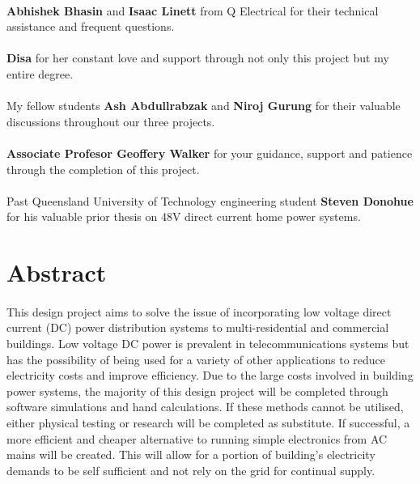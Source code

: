 \paragraph{}
\textbf{Abhishek Bhasin} and \textbf{Isaac Linett} from Q Electrical for their technical assistance and frequent questions.

\paragraph{}
\textbf{Disa} for her constant love and support through not only this project but my entire degree.    

\paragraph{}
My fellow students \textbf{Ash Abdullrabzak} and \textbf{Niroj Gurung} for their valuable discussions throughout our three projects. 

\paragraph{}
\textbf{Associate Profesor Geoffery Walker} for your guidance, support and patience through the completion of this project. 

\paragraph{}
Past Queensland University of Technology engineering student \textbf{Steven Donohue} for his valuable prior thesis on 48V direct current home power systems.  

\newpage


\section*{Abstract}

\paragraph{}
This design project aims to solve the issue of incorporating low voltage direct current (DC) power distribution systems to multi-residential and commercial buildings. Low voltage DC power is prevalent in telecommunications systems but has the possibility of being used for a variety of other applications to reduce electricity costs and improve efficiency. Due to the large costs involved in building power systems, the majority of this design project will be completed through software simulations and hand calculations. If these methods cannot be utilised, either physical testing or research will be completed as substitute. If successful, a more efficient and cheaper alternative to running simple electronics from AC mains will be created. This will allow for a portion of building's electricity demands to be self sufficient and not rely on the grid for continual supply.   
 
\newpage
